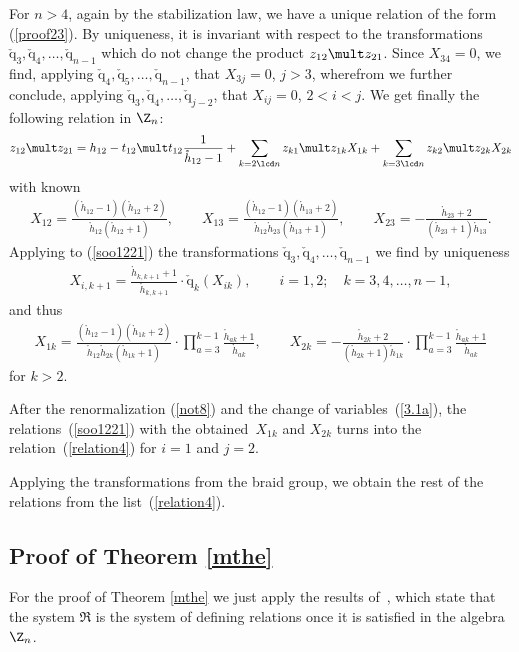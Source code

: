 \documentclass[11pt]{article}
\def\nplus{\mathfrak{n}}\def\nn{\nonumber}\def\nin{\noindent}
\def\q{\check{\mathrm q}}\def\Q{\mathrm{Q}}\def\r#1{(\ref{#1})}\let\rf=\r
\def\s{z}\def\S{\mathrm {S}}\def\si{\sigma}\def\Sp{\S^{\nplus}}\def\sy{\acute{\sigma}}\def\th{\mathring{h}}
\numberwithin{equation}{section}
\begin{document}
For $n>4$, again by the stabilization law, we have a unique relation of the form \rf{proof23}. By uniqueness, it is invariant with respect to the
transformations $\q_3,\q_4,\dots ,\q_{n-1}$ which do not change the product $\s_{12}\mult \s_{21}$. Since $X_{34}=0$, we f\/ind, applying
$\q_4, \q_5, \dots ,\q_{n-1}$,  that  $X_{3j}=0$, $j>3$, wherefrom we further conclude, applying $\q_3,\q_4,\dots ,\q_{j-2}$, that
$X_{ij}=0$, $2<i<j$. We get f\/inally the following relation in $\Z_n$:
\begin{gather} \label{soo1221}
\s_{12}\mult \s_{21}=h_{12}-t_{12}\mult t_{12} \frac{1}{\th_{12}-1}
+\sum_{k=2\lcd n}\s_{k1}\mult\s_{1k}X_{1k}+\sum_{k=3\lcd n}\s_{k2}\mult\s_{2k}X_{2k}
\end{gather}
with known
\begin{gather*}
X_{12}=\frac{(\th_{12}-1)(\th_{12} +2)}{\th_{12}(\th_{12} +1)} ,\qquad
X_{13}=\frac{(\th_{12}-1) (\th_{13} +2)}{\th_{12}\th_{23}(\th_{13}+1)} ,\qquad
X_{23}=-\frac{\th_{23} +2}{(\th_{23} +1)\th_{13}} .
\end{gather*}
Applying to \rf{soo1221} the transformations $\q_3, \q_4,\dots ,\q_{n-1}$ we f\/ind by uniqueness
\begin{gather*}X_{i,k+1}=\frac{\th_{k,k+1}+1}{\th_{k,k+1}} \cdot\q_k(X_{ik}) ,\qquad i=1,2 ;\quad k=3,4,\dots ,n-1 ,
\end{gather*}
and thus
\begin{gather*}
 X_{1k}=\frac{(\th_{12}-1) (\th_{1k} +2)}{\th_{12}\th_{2k}(\th_{1k}+1)}\cdot\prod_{a=3}^{k-1}\frac{\th_{ak}+1}{\th_{ak}}  ,
\qquad X_{2k}=-\frac{\th_{2k} +2}{(\th_{2k} +1)\th_{1k}}\cdot\prod_{a=3}^{k-1}\frac{\th_{ak}+1}{\th_{ak}}
\end{gather*}
for $k>2$.


After the renormalization \rf{not8} and the change of variables~\rf{3.1a}, the relations~\rf{soo1221}  with the
obtained~$X_{1k}$ and $X_{2k}$ turns into the relation~\rf{relation4} for $i=1$ and $j=2$.


Applying the transformations from the braid group, we obtain the rest of the relations from the list~\rf{relation4}.

\subsection{Proof of Theorem \ref{mthe}}\label{proofmain}

For the proof of Theorem \ref{mthe} we just apply the results of~\cite{KO3}, which state that the system ${\mathfrak R}$ is the system of
def\/ining relations once it is satisf\/ied in the algebra $\Z_n$.
\end{document}
